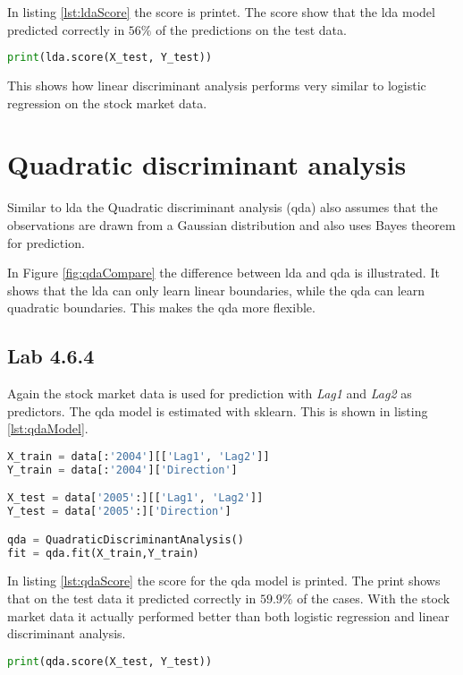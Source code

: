 In listing \ref{lst:ldaScore} the score is printet. The score show that the lda model predicted correctly in $56\%$ of the predictions on the test data. 
\begin{lstlisting}[language=Python, label=lst:ldaScore, caption=printing lda score]
print(lda.score(X_test, Y_test))
\end{lstlisting}

This shows how linear discriminant analysis performs very similar to logistic regression on the stock market data.

\section{Quadratic discriminant analysis}
Similar to lda the Quadratic discriminant analysis (qda) also assumes that the observations are drawn from a Gaussian distribution and also uses Bayes theorem for prediction. 


In Figure \ref{fig:qdaCompare} the difference between lda and qda is illustrated. It shows that the lda can only learn linear boundaries, while the qda can learn quadratic boundaries. This makes the qda more flexible. 

\subsection{Lab 4.6.4}
Again the stock market data is used for prediction with \emph{Lag1} and \emph{Lag2} as predictors. The qda model is estimated with sklearn. This is shown in listing \ref{lst:qdaModel}.

\begin{lstlisting}[language=Python, label=lst:qdaModel, caption=Creating quadratic discriminant analysis model sklearn]
X_train = data[:'2004'][['Lag1', 'Lag2']]
Y_train = data[:'2004']['Direction']

X_test = data['2005':][['Lag1', 'Lag2']]
Y_test = data['2005':]['Direction']

qda = QuadraticDiscriminantAnalysis()
fit = qda.fit(X_train,Y_train)
\end{lstlisting}

In listing \ref{lst:qdaScore} the score for the qda model is printed. The print shows that on the test data it predicted correctly in $59.9\%$ of the cases. With the stock market data it actually performed better than both logistic regression and linear discriminant analysis. 
\begin{lstlisting}[language=Python, label=lst:qdaScore, caption=Printing qda score]
print(qda.score(X_test, Y_test))
\end{lstlisting}

